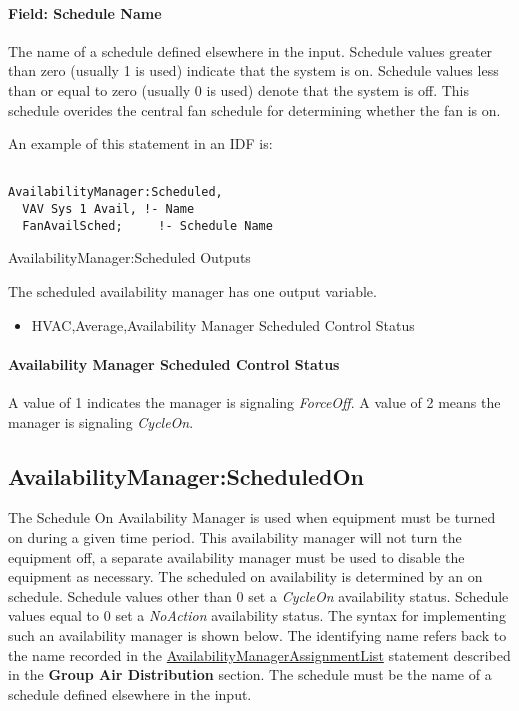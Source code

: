 \paragraph{Field: Schedule Name}\label{field-schedule-name-006}

The name of a schedule defined elsewhere in the input. Schedule values greater than zero (usually 1 is used) indicate that the system is on. Schedule values less than or equal to zero (usually 0 is used) denote that the system is off. This schedule overides the central fan schedule for determining whether the fan is on.

An example of this statement in an IDF is:

\begin{lstlisting}

AvailabilityManager:Scheduled,
  VAV Sys 1 Avail, !- Name
  FanAvailSched;     !- Schedule Name
\end{lstlisting}

AvailabilityManager:Scheduled Outputs

The scheduled availability manager has one output variable.

\begin{itemize}
\tightlist
\item
  HVAC,Average,Availability Manager Scheduled Control Status
\end{itemize}

\paragraph{Availability Manager Scheduled Control Status}\label{availability-manager-scheduled-control-status}

A value of 1 indicates the manager is signaling \emph{ForceOff}. A value of 2 means the manager is signaling \emph{CycleOn}.

\subsection{AvailabilityManager:ScheduledOn}\label{availabilitymanagerscheduledon}

The Schedule On Availability Manager is used when equipment must be turned on during a given time period. This availability manager will not turn the equipment off, a separate availability manager must be used to disable the equipment as necessary. The scheduled on availability is determined by an on schedule. Schedule values other than 0 set a \emph{CycleOn} availability status. Schedule values equal to 0 set a \emph{NoAction} availability status. The syntax for implementing such an availability manager is shown below. The identifying name refers back to the name recorded in the \hyperref[availabilitymanagerassignmentlist]{AvailabilityManagerAssignmentList} statement described in the \textbf{Group Air Distribution} section. The schedule must be the name of a schedule defined elsewhere in the input.

